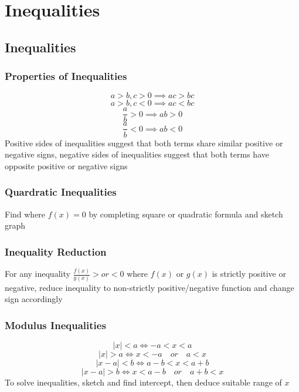 \documentclass[../main]{subfiles}
\begin{document}
\section{Inequalities}

\subsection{Inequalities}

	\subsubsection{Properties of Inequalities}
	\[ a > b , c > 0 \implies ac > bc \]
	\[ a > b , c < 0 \implies ac < bc \]
	\[ \frac{a}{b} > 0 \implies ab > 0 \]
	\[ \frac{a}{b} < 0 \implies ab < 0 \]
	Positive sides of inequalities suggest that both terms share similar positive or negative signs, negative sides of inequalities suggest that both terms have opposite positive or negative signs
	\subsubsection{Quardratic Inequalities}
	Find where \(f(x)=0\) by completing square or quadratic formula and sketch graph
	\subsubsection{Inequality Reduction}
	For any inequality \(\frac{f(x)}{g(x)} > or < 0\) where \(f(x)\) or \(g(x)\) is strictly positive or negative, reduce inequality to non-strictly positive/negative function and change sign accordingly
	\subsubsection{Modulus Inequalities}
	\[ |x| < a \iff -a < x < a \]
	\[ |x| > a \iff x  < -a \quad or \quad a < x \]
	\[ |x-a| < b \iff a-b < x < a+b \]
	\[ |x-a| > b \iff x < a-b \quad or \quad a+b < x \]
	To solve inequalities, sketch and find intercept, then deduce suitable range of \(x\)
\end{document}
